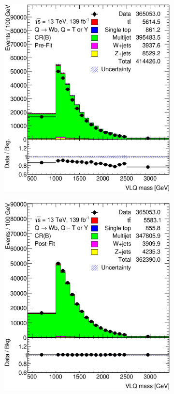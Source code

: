 \begin{figure}[hbt!]
\begin{subfigure}{.35\textwidth}
		\caption{}
	\end{subfigure}
	\begin{subfigure}{.35\textwidth}
		\centering
		\includegraphics[width=\linewidth,height=\textheight,keepaspectratio]{CR_B_VLQM.eps}
		\caption{}
	\end{subfigure}\hspace{0.6cm}
	\begin{subfigure}{.35\textwidth}
		\centering
		\includegraphics[width=\linewidth,height=\textheight,keepaspectratio]{CR_B_VLQM_postFit.eps}

\end{subfigure}
\end{figure}
